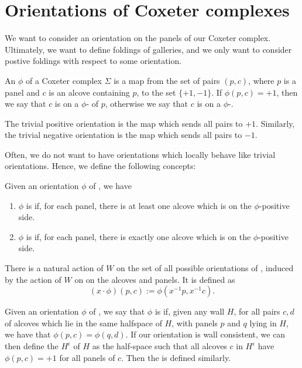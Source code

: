 \documentclass[11pt]{article}
\begin{document}
\section{Orientations of Coxeter complexes}\label{6}

We want to consider an orientation on the panels of our Coxeter complex. Ultimately, we want to define foldings of galleries, and we only want to consider postive foldings with respect to some orientation.


\begin{definition}
    An  $\phi$ of a Coxeter complex $\Sigma$ is a map from the set of pairs $(p,c)$, where $p$ is a panel and $c$ is an alcove containing $p$, to the set $\{+1,-1\}$. If $\phi (p,c)=+1$, then we say that $c$ is on a $\phi$- of $p$, otherwise we say that $c$ is on a $\phi$-. 
\end{definition}


\begin{example}
    The trivial positive orientation is the map which sends all pairs to $+1$. Similarly, the trivial negative orientation is the map which sends all pairs to $-1$. 
\end{example}

Often, we do not want to have orientations which locally behave like trivial orientations. Hence, we define the following concepts:

\begin{definition}
    Given an orientation $\phi$ of \sg, we have
    \begin{enumerate}
        \item $\phi$ is  if, for each panel, there is at least one alcove which is on the $\phi$-positive side.
        \item $\phi$ is  if, for each panel, there is exactly one alcove which is on the $\phi$-positive side.
    \end{enumerate}
\end{definition}


There is a natural action of $W$ on the set of all possible orientations of \sg, induced by the action of $W$ on on the alcoves and panels. It is defined as 
\[(x\cdot\phi)(p,c):=\phi(x^{-1}p,x^{-1}c).\]

\begin{definition}
    Given an orientation $\phi$ of \sg, we say that $\phi$ is  if, given any wall $H$, for all pairs $c,d$ of alcoves which lie in the same halfspace of $H$, with panels $p$ and $q$ lying in $H$, we have that $\phi(p,c)=\phi(q,d)$. If our orientation is wall consistent, we can then define the  $H^{\epsilon}$ of $H$ as the half-space such that all alcoves $c$ in $H^{\epsilon}$ have $\phi(p,c)=+1$ for all panels of $c$. Then the  is defined similarly.
\end{definition}
\end{document}
